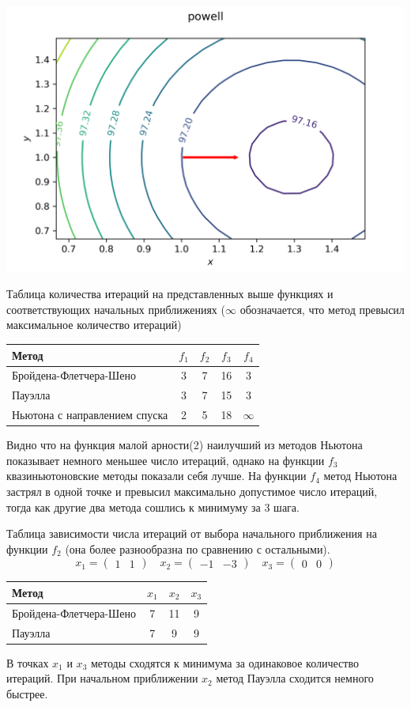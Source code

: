 \documentclass[english]{article}
\begin{document}
\begin{center}
  \includegraphics[scale=0.7]{plots/contours_powell_9.png}
\end{center}
Таблица количества итераций на представленных выше функциях и
соответствующих начальных приближениях (\(\infty\) обозначается, что
метод превысил максимальное количество итераций)
\begin{center}
  \begin{longtable}{l|cccc}
    Метод &  \(f_1\) & \(f_2\) & \(f_3\) & \(f_4\)\\
    \hline
    Бройдена-Флетчера-Шено & 3 & 7 & 16 & 3 \\
    \hline
    Пауэлла & 3 & 7 & 15 & 3 \\
    \hline
    Ньютона с направлением спуска & 2 & 5 & 18 & \(\infty\)
  \end{longtable}
\end{center}
Видно что на функция малой арности(2) наилучший из методов Ньютона
показывает немного меньшее число итераций, однако на функции \(f_3\)
квазиньютоновские методы показали себя лучше. На функции \(f_4\) метод
Ньютона застрял в одной точке и превысил максимально допустимое число
итераций, тогда как другие два метода сошлись к минимуму за 3 шага.


Таблица зависимости числа итераций от выбора начального приближения на функции \(f_2\) (она более разнообразна по сравнению с остальными).
\[ x_1 = \begin{pmatrix}
  1 & 1
\end{pmatrix} \quad x_2 = \begin{pmatrix}
  -1 & -3
\end{pmatrix} \quad x_3 = \begin{pmatrix}
  0 & 0
\end{pmatrix}\]
\begin{center}
  \begin{longtable}{l|ccc}
    Метод &  \(x_1\) & \(x_2\) & \(x_3\) \\
    \hline
    Бройдена-Флетчера-Шено &  7 & 11 & 9 \\
    \hline
    Пауэлла &  7 & 9 & 9 \\
  \end{longtable}
\end{center}
В точках \(x_1\) и \(x_3\) методы сходятся к минимума за одинаковое
количество итераций. При начальном приближении \(x_2\) метод Пауэлла
сходится немного быстрее.
\end{document}
